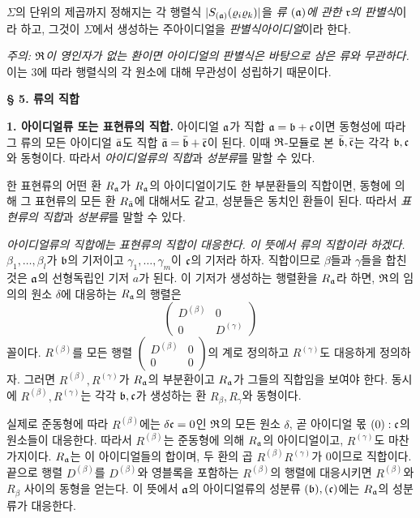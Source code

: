 \(\Sigma\)의 단위의 제곱까지 정해지는 각 행렬식 \(|S_{(\mathfrak{a})}(\varrho_i\varrho_k)|\)을 \emph{류 \((\mathfrak{a})\)에 관한 \(\mathfrak r\)의 판별식}이라 하고, 그것이 \(\Sigma\)에서 생성하는 주아이디얼을 \emph{판별식아이디얼}이라 한다.

\emph{주의: \(\mathfrak{R}\)이 영인자가 없는 환이면 아이디얼의 판별식은 바탕으로 삼은 류와 무관하다.} 이는 3에 따라 행렬식의 각 원소에 대해 무관성이 성립하기 때문이다.

\begin{center}
\textbf{§ 5. 류의 직합}
\end{center}

\textbf{1. 아이디얼류 또는 표현류의 직합.} 아이디얼 \(\mathfrak{a}\)가 직합 \(\mathfrak{a}=\mathfrak{b}+\mathfrak c\)이면 동형성에 따라 그 류의 모든 아이디얼 \(\bar{\mathfrak{a}}\)도 직합 \(\bar{\mathfrak{a}}=\bar{\mathfrak{b}}+\bar{\mathfrak c}\)이 된다. 이때 \(\mathfrak{R}\)-모듈로 본 \(\bar{\mathfrak{b}},\bar{\mathfrak c}\)는 각각 \(\mathfrak{b},\mathfrak c\)와 동형이다. 따라서 \emph{아이디얼류의 직합}과 \emph{성분류}를 말할 수 있다.

한 표현류의 어떤 환 \(R_{\mathfrak{a}}\)가 \(R_{\mathfrak{a}}\)의 아이디얼이기도 한 부분환들의 직합이면, 동형에 의해 그 표현류의 모든 환 \(R_{\bar{\mathfrak{a}}}\)에 대해서도 같고, 성분들은 동치인 환들이 된다. 따라서 \emph{표현류의 직합}과 \emph{성분류}를 말할 수 있다.

\emph{아이디얼류의 직합에는 표현류의 직합이 대응한다. 이 뜻에서 류의 직합이라 하겠다.} \(\beta_1,\ldots,\beta_l\)가 \(\mathfrak{b}\)의 기저이고 \(\gamma_1,\ldots,\gamma_m\)이 \(\mathfrak c\)의 기저라 하자. 직합이므로 \(\beta\)들과 \(\gamma\)들을 합친 것은 \(\mathfrak{a}\)의 선형독립인 기저 \(a\)가 된다. 이 기저가 생성하는 행렬환을 \(R_{\mathfrak{a}}\)라 하면, \(\mathfrak{R}\)의 임의의 원소 \(\delta\)에 대응하는 \(R_{\mathfrak{a}}\)의 행렬은
\[
\begin{pmatrix}D^{(\beta)}&0\\0&D^{(\gamma)}\end{pmatrix}
\]
꼴이다. \(R^{(\beta)}\)를 모든 행렬 \((\begin{smallmatrix}D^{(\beta)}&0\\0&0\end{smallmatrix})\)의 계로 정의하고 \(R^{(\gamma)}\)도 대응하게 정의하자. 그러면 \(R^{(\beta)},R^{(\gamma)}\)가 \(R_{\mathfrak{a}}\)의 부분환이고 \(R_{\mathfrak{a}}\)가 그들의 직합임을 보여야 한다. 동시에 \(R^{(\beta)},R^{(\gamma)}\)는 각각 \(\mathfrak{b},\mathfrak c\)가 생성하는 환 \(R_\beta,R_\gamma\)와 동형이다.

실제로 준동형에 따라 \(R^{(\beta)}\)에는 \(\delta\mathfrak c=0\)인 \(\mathfrak{R}\)의 모든 원소 \(\delta\), 곧 아이디얼 몫 \((0):\mathfrak c\)의 원소들이 대응한다. 따라서 \(R^{(\beta)}\)는 준동형에 의해 \(R_{\mathfrak{a}}\)의 아이디얼이고, \(R^{(\gamma)}\)도 마찬가지이다. \(R_{\mathfrak{a}}\)는 이 아이디얼들의 합이며, 두 환의 곱 \(R^{(\beta)}R^{(\gamma)}\)가 0이므로 직합이다. 끝으로 행렬 \(D^{(\beta)}\)를 \(D^{(\beta)}\)와 영블록을 포함하는 \(R^{(\beta)}\)의 행렬에 대응시키면 \(R^{(\beta)}\)와 \(R_\beta\) 사이의 동형을 얻는다. 이 뜻에서 \(\mathfrak{a}\)의 아이디얼류의 성분류 \((\mathfrak{b}),(\mathfrak c)\)에는 \(R_{\mathfrak{a}}\)의 성분류가 대응한다.

